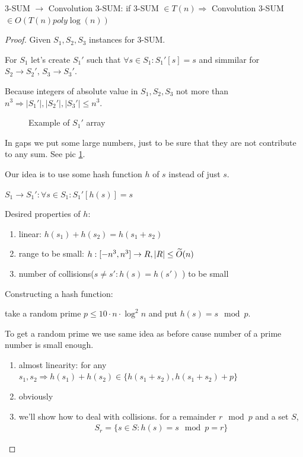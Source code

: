 \begin{thm}
  3-SUM $\to$ Convolution 3-SUM: if 3-SUM $\in T(n) \Longrightarrow$ Convolution 3-SUM $\in O(T(n) poly \log(n))$
\end{thm}
\begin{proof}
  Given $S_1, S_2, S_3$ instances for 3-SUM.

  For $S_1$ let's create $S_1'$ such that $\forall s \in S_1 : S_1'[s] = s$
  and simmilar for $S_2 \to S_2', \, S_3 \to S_3'$.

  Because integers of absolute value in $S_1, S_2, S_3$ not more than $n^3 \Longrightarrow |S_1'|, |S_2'|, |S_3'| \leq n^3$.

\begin{figure}[ht]
    \centering
    \caption{Example of $S_1'$ array }
    \label{fig:pc20_3sum_to_convolution}
\end{figure}

  In gaps we put some large numbers, just to be sure that they are not contribute to any sum. See pic \ref{fig:pc20_3sum_to_convolution}.


  Our idea is to use some hash function $h$ of $s$ instead of just $s$.

  $S_1 \to S_1' : \forall s \in S_1 : S_1'[h(s)] = s$

  Desired properties of $h$:
  \begin{enumerate}
	\item linear: $h(s_1) + h(s_2) = h(s_1 + s_2)$
	\item range to be small: $h: [-n^3, n^3] \to R, |R| \leq \widetilde{O}(n)$
	\item number of collisions($s \neq s' : h(s) = h(s')$ ) to be small
  \end{enumerate}

  Constructing a hash function:

  take a random prime $p \leq 10 \cdot n \cdot \log^2 n$ and put $h(s) = s \mod p$.

  To get a random prime we use same idea as before cause number of a prime number is small enough.

  \begin{enumerate}
	\item almost linearity: for any $s_1, s_2 \Rightarrow h(s_1) + h(s_2) \in \{ h(s_1 + s_2), h(s_1 + s_2) + p \}$
	\item obviously
	\item we'll show how to deal with collisions.
	  for a remainder $r \mod p$ and a set $S$,
	  \begin{align*}
		S_r = \{s \in S: h(s) = s \mod p = r \}
	  \end{align*}



\end{enumerate}
\end{proof}
